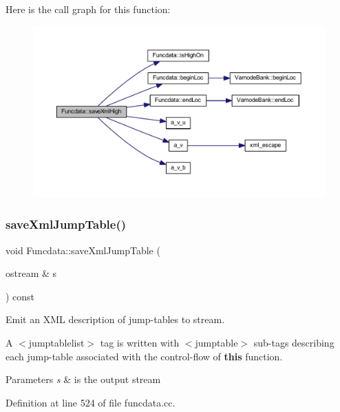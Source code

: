 Here is the call graph for this function\+:
\nopagebreak
\begin{figure}[H]
\begin{center}
\leavevmode
\includegraphics[width=350pt]{class_funcdata_accde64f2642f6e86545df826e2751f8b_cgraph}
\end{center}
\end{figure}
\mbox{\label{class_funcdata_a5f2d5d66f0ae7c5c4eae20d60ad30897}} 
\subsubsection{\texorpdfstring{saveXmlJumpTable()}{saveXmlJumpTable()}}
{\footnotesize\ttfamily void Funcdata\+::save\+Xml\+Jump\+Table (\begin{DoxyParamCaption}\item[{ostream \&}]{s }\end{DoxyParamCaption}) const}



Emit an X\+ML description of jump-\/tables to stream. 

A $<$jumptablelist$>$ tag is written with $<$jumptable$>$ sub-\/tags describing each jump-\/table associated with the control-\/flow of {\bfseries{this}} function. 
\begin{DoxyParams}{Parameters}
{\em s} & is the output stream \\
\hline
\end{DoxyParams}


Definition at line 524 of file funcdata.\+cc.

\mbox{\label{class_funcdata_a7630153130424a56fac5a4b4a4792b60}} 
